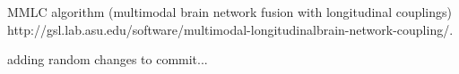 MMLC algorithm (multimodal brain network 
fusion with longitudinal couplings)
http://gsl.lab.asu.edu/software/multimodal-longitudinalbrain-network-coupling/. 
\cite{Zhang2022}



adding random changes to commit...



